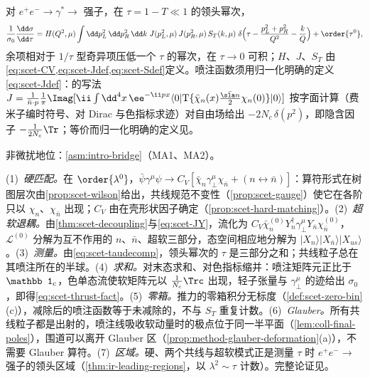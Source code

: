 \begin{theorem}\label{thm:scet-thrust}
对 $e^+e^-\to\gamma^*\to$ 强子，在 $\tau=1-T\ll1$ 的领头幂次，
\begin{equation}\label{eq:scet-thrust-fact}
\frac{1}{\sigma_0}\frac{\dd\sigma}{\dd\tau}=H(Q^2,\mu)\int\dd p_L^2\,\dd p_R^2\,\dd k\;J(p_L^2,\mu)\,J(p_R^2,\mu)\,S_T(k,\mu)\;
\delta\Big(\tau-\frac{p_L^2+p_R^2}{Q^2}-\frac kQ\Big)+\order{\tau^0},
\end{equation}
余项相对于 $1/\tau$ 型奇异项压低一个 $\tau$ 的幂次，在 $\tau\to0$ 可积；$H$、$J$、$S_T$ 由\cref{eq:scet-CV,eq:scet-Jdef,eq:scet-Sdef}定义。喷注函数须用归一化明确的定义\cref{eq:scet-Jdef}：\cite[式~(2.6)]{BecherSchwartz2008}的写法 $J=\frac{1}{\bar n\cdot p}\frac1\pi\Imag[\ii\int\dd^4x\,\ee^{-\ii px}\langle0|\mathrm T\{\bar\chi_n(x)\frac{\bar{\sla n}}2\chi_n(0)\}|0\rangle]$ 按字面计算（费米子编时符号、对 Dirac 与色指标求迹）对自由场给出 $-2N_c\,\delta(p^2)$，即隐含因子 $-\frac1{2N_c}\Tr$；等价而归一化明确的定义见\cite[式~(3)、(6)]{Becher:2006qw}。%
\par 非微扰地位：\cref{asm:intro-bridge}（MA1、MA2）。
\end{theorem}

\begin{proofsketch}
(1)~\emph{硬匹配。}在 $\order{\lambda^0}$，$\bar\psi\gamma^\mu\psi\to C_V[\bar\chi_n\gamma_\perp^\mu\chi_{\bar n}+(n\leftrightarrow\bar n)]$：算符形式在树图层次由\cref{prop:scet-wilson}给出，共线规范不变性（\cref{prop:scet-gauge}）使它在各阶只以 $\chi_n$、$\chi_{\bar n}$ 出现；$C_V$ 由在壳形状因子确定（\cref{prop:scet-hard-matching}）。(2)~\emph{超软退耦。}由\cref{thm:scet-decoupling}与\cref{eq:scet-JY}，流化为 $C_V\bar\chi^{(0)}_nY_n^\dagger\gamma_\perp^\mu Y_{\bar n}\chi^{(0)}_{\bar n}$，$\mathcal L^{(0)}$ 分解为互不作用的 $n$、$\bar n$、超软三部分，态空间相应地分解为 $|X_n\rangle|X_{\bar n}\rangle|X_{us}\rangle$。(3)~\emph{测量。}由\cref{eq:scet-taudecomp}，领头幂次的 $\tau$ 是三部分之和；共线粒子总在其喷注所在的半球。(4)~\emph{求和。}对末态求和、对色指标缩并：喷注矩阵元正比于 $\mathbb 1_{\rm c}$，色单态流使软矩阵元以 $\frac1{N_c}\Trc$ 出现，轻子张量与 $\gamma_\perp^\mu$ 的迹给出 $\sigma_0$，即得\cref{eq:scet-thrust-fact}。(5)~\emph{零箱。}推力的零箱积分无标度（\cref{def:scet-zero-bin}(c)），减除后的喷注函数等于未减除的，不与 $S_T$ 重复计数。(6)~\emph{Glauber。}所有共线粒子都是出射的，喷注线吸收软动量时的极点位于同一半平面（\cref{lem:coll-final-poles}），围道可以离开 Glauber 区（\cref{prop:method-glauber-deformation}(a)），不需要 Glauber 算符。(7)~\emph{区域。}硬、两个共线与超软模式正是测量 $\tau$ 时 $e^+e^-\to$ 强子的领头区域（\cref{thm:ir-leading-regions}，以 $\lambda^2\sim\tau$ 计数）。完整论证见\cite{Bauer:2003di,Fleming:2007qr,Schwartz:2007ib,Fleming:2007xt,BecherSchwartz2008,Bauer:2008dt}。
\end{proofsketch}

